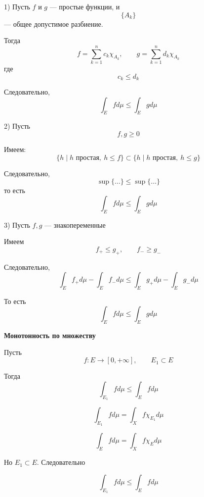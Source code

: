 \documentclass[12pt,a4paper]{article}
\begin{document}
\begin{proofbox}{}

    1) Пусть $f$ и $g$ — простые функции, и
    \[
        \{A_k\}
    \]
    — общее допустимое разбиение.

    Тогда
    \[
        f=\sum_{k=1}^{n}c_k\chi_{A_k},
        \qquad
        g=\sum_{k=1}^{n}d_k\chi_{A_k}
    \]
    где
    \[
        c_k\leq d_k
    \]

    Следовательно,
    \[
        \int_E f d\mu\leq\int_E g d\mu
    \]

    2) Пусть
    \[
        f,g\geq0
    \]

    Имеем:
    \[
        \{h\mid h\text{ простая},\ h\leq f\}
        \subset
        \{h\mid h\text{ простая},\ h\leq g\}
    \]

    Следовательно,
    \[
        \sup\{\ldots\}\leq\sup\{\ldots\}
    \]
    то есть
    \[
        \int_E f d\mu\leq\int_E g d\mu
    \]

    3) Пусть $f,g$ — знакопеременные

    Имеем
    \[
        f_+\leq g_+,
        \qquad
        f_-\geq g_-
    \]

    Следовательно,
    \[
        \int_E f_+ d\mu-\int_E f_- d\mu
        \leq
        \int_E g_+ d\mu-\int_E g_- d\mu
    \]

    То есть
    \[
        \int_E f d\mu\leq\int_E g d\mu
    \]

\end{proofbox}

\begin{corollary}
    \textbf{Монотонность по множеству}

    Пусть
    \[
        f:E\to[0,+\infty],
        \qquad
        E_1\subset E
    \]

    Тогда
    \[
        \int_{E_1}f d\mu
        \leq
        \int_Ef d\mu
    \]

\end{corollary}

\begin{proofbox}{}

    \[
        \int_{E_1}f d\mu
        =
        \int_X f\chi_{E_1} d\mu
    \]

    \[
        \int_{E}f d\mu
        =
        \int_X f\chi_{E} d\mu
    \]

    Но $E_1 \subset E$. Следовательно

    \[
        \int_{E_1}f d\mu
        \leq
        \int_Ef d\mu
    \]

\end{proofbox}
\end{document}
